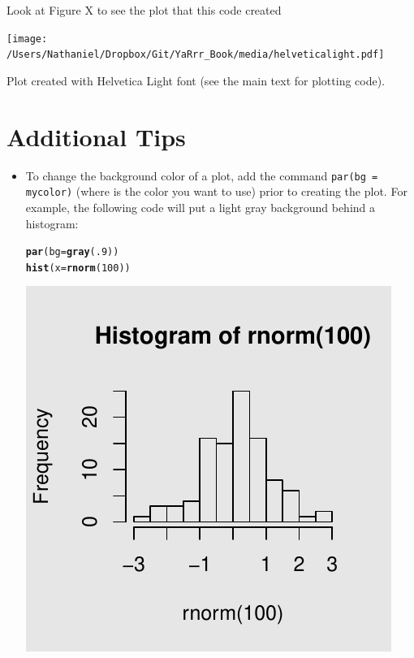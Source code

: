\documentclass{tufte-book}\usepackage[]{graphicx}\usepackage[]{color}
\makeatletter
\def\maxwidth{ %
  \ifdim\Gin@nat@width>\linewidth
    \linewidth
  \else
    \Gin@nat@width
  \fi
}
\newcommand{\hlnum}[1]{\textcolor[rgb]{0.686,0.059,0.569}{#1}}%
\newcommand{\hlstd}[1]{\textcolor[rgb]{0.345,0.345,0.345}{#1}}%
\newcommand{\hlkwc}[1]{\textcolor[rgb]{0.333,0.667,0.333}{#1}}%
\newcommand{\hlkwd}[1]{\textcolor[rgb]{0.737,0.353,0.396}{\textbf{#1}}}%
\newenvironment{kframe}{%
 \def\at@end@of@kframe{}%
 \ifinner\ifhmode%
  \def\at@end@of@kframe{\end{minipage}}%
  \begin{minipage}{\columnwidth}%
 \fi\fi%
 \def\FrameCommand##1{\hskip\@totalleftmargin \hskip-\fboxsep
 \colorbox{shadecolor}{##1}\hskip-\fboxsep
     \hskip-\linewidth \hskip-\@totalleftmargin \hskip\columnwidth}%
 \MakeFramed {\advance\hsize-\width
   \@totalleftmargin\z@ \linewidth\hsize
   \@setminipage}}%
 {\par\unskip\endMakeFramed%
 \at@end@of@kframe}
\newenvironment{knitrout}{}{} %
\makeatother
\begin{document}
\begin{footnotesize}
Look at Figure X to see the plot that this code created

\begin{marginfigure}
\texttt{[image: /Users/Nathaniel/Dropbox/Git/YaRrr\_Book/media/helveticalight.pdf]}
\caption{Plot created with Helvetica Light font (see the main text for plotting code).}
\label{fig:helvetica}
\end{marginfigure}


\pagebreak
\section{Additional Tips}

\begin{itemize}


  \item To change the background color of a plot, add the command \texttt{par(bg = mycolor)} (where  is the color you want to use) prior to creating the plot. For example, the following code will put a light gray background behind a histogram:
  
\begin{knitrout}
\color{fgcolor}\begin{kframe}
\begin{alltt}
\hlkwd{par}\hlstd{(}\hlkwc{bg} \hlstd{=} \hlkwd{gray}\hlstd{(}\hlnum{.9}\hlstd{))}
\hlkwd{hist}\hlstd{(}\hlkwc{x} \hlstd{=} \hlkwd{rnorm}\hlstd{(}\hlnum{100}\hlstd{))}
\end{alltt}
\end{kframe}
\includegraphics[width=\maxwidth]{figure/unnamed-chunk-189-1} 


\end{knitrout}
\end{itemize}
\end{footnotesize}
\end{document}
